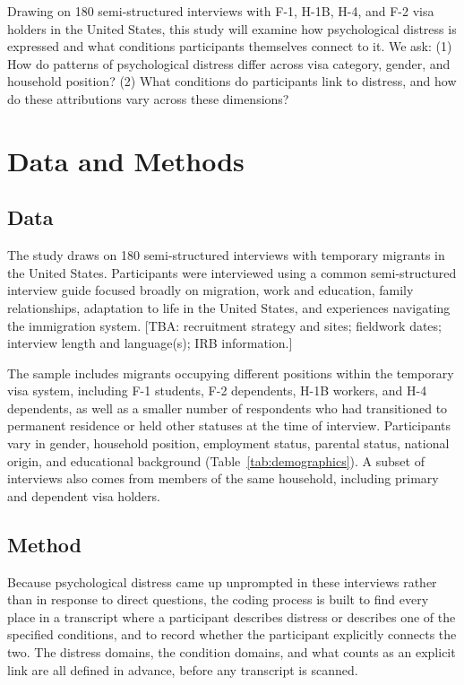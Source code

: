 \documentclass[12pt]{article}
\begin{document}
Drawing on 180 semi-structured interviews with F-1, H-1B, H-4, and F-2 visa holders in the United States, this study will
examine how psychological distress is expressed and what conditions participants themselves connect to it. We ask: (1)
How do patterns of psychological distress differ across visa category, gender, and household position? (2) What conditions
do participants link to distress, and how do these attributions vary across these dimensions?


\section{Data and Methods}

\subsection*{Data}
The study draws on 180 semi-structured interviews with temporary migrants in the United States. Participants were interviewed
using a common semi-structured interview guide focused broadly on migration, work and education, family relationships,
adaptation to life in the United States, and experiences navigating the immigration system. [TBA: recruitment strategy
and sites; fieldwork dates; interview length and language(s); IRB information.]

The sample includes migrants occupying different positions within the temporary visa system, including F-1 students,
F-2 dependents, H-1B workers, and H-4 dependents, as well as a smaller number of respondents who had transitioned to
permanent residence or held other statuses at the time of interview. Participants vary in gender, household position,
employment status, parental status, national origin, and educational background (Table~\ref{tab:demographics}).
A subset of interviews also comes from members of the same household, including primary and dependent visa holders.



\subsection*{Method}

Because psychological distress came up unprompted in these interviews rather than in response to direct questions, the
coding process is built to find every place in a transcript where a participant describes distress or describes one of
the specified conditions, and to record whether the participant explicitly connects the two. The distress domains, the
condition domains, and what counts as an explicit link are all defined in advance, before any transcript is scanned.
\end{document}
